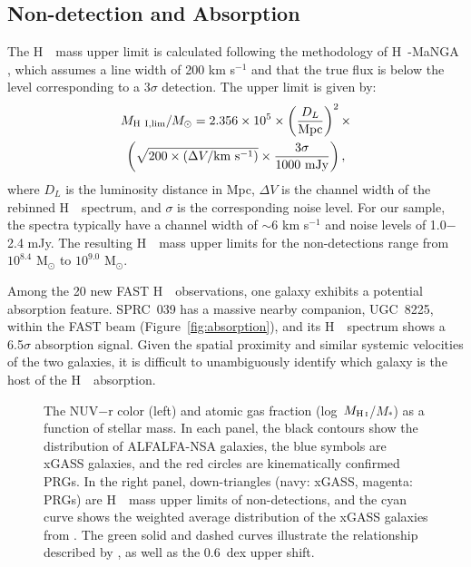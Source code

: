 \documentclass[twocolumn]{aastex631}
\newcommand{\MHI}{$M_{\rm H\, \textsc{i}}$}
\newcommand{\mstar}{$M_{*}$}
\def\HI{H\,  {\textsc{\romannumeral 1}}}
\begin{document}
\subsection{Non-detection and Absorption}

The \HI\ mass upper limit is calculated following the methodology of \HI-MaNGA \citep{Masters2019MNRAS.488.3396M, Stark2021AAS...23752707S}, which assumes a line width of 200 km s$^{-1}$ and that the true flux is below the level corresponding to a 3$\sigma$ detection. The upper limit is given by:
\begin{multline}
M_{\rm H\ I, lim}/M_{\odot} = 2.356\times10^5 \times
\left(\frac{D_L}{\rm Mpc}\right)^2 \times \\
\left(\sqrt{200 \times (\Delta V/\rm km\ s^{-1})} \times \frac{3\sigma}{1000\ \rm mJy}\right),  
\label{equ:upper}
\end{multline}
\noindent where $D_L$ is the luminosity distance in Mpc, $\Delta V$ is the channel width of the rebinned \HI\ spectrum, and $\sigma$ is the corresponding noise level. For our sample, the spectra typically have a channel width of $\sim$6 km s$^{-1}$ and noise levels of 1.0$-$2.4 mJy. The resulting \HI\ mass upper limits for the non-detections range from $10^{8.4}$ M$_\odot$ to $10^{9.0}$ M$_\odot$.

Among the 20 new FAST \HI\ observations, one galaxy exhibits a potential absorption feature. SPRC~039 has a massive nearby companion, UGC~8225, within the FAST beam (Figure~\ref{fig:absorption}), and its \HI\ spectrum shows a 6.5$\sigma$ absorption signal. Given the spatial proximity and similar systemic velocities of the two galaxies, it is difficult to unambiguously identify which galaxy is the host of the \HI\ absorption.

\begin{figure}
\caption{
The NUV$-$r color (left) and atomic gas fraction (log~\MHI/\mstar) as a function of stellar mass. In each panel, the black contours show the distribution of ALFALFA-NSA galaxies, the blue symbols are xGASS galaxies, and the red circles are kinematically confirmed PRGs. In the right panel, down-triangles (navy: xGASS, magenta: PRGs) are \HI\ mass upper limits of non-detections, and the cyan curve shows the weighted average distribution of the xGASS galaxies from \citet{Catinella2018MNRAS.476..875C}. The green solid and dashed curves illustrate the relationship described by \citet{Scholte2024MNRAS.535.2341S}, as well as the 0.6~dex upper shift.
}
\label{fig:gf}
\end{figure}
\end{document}
